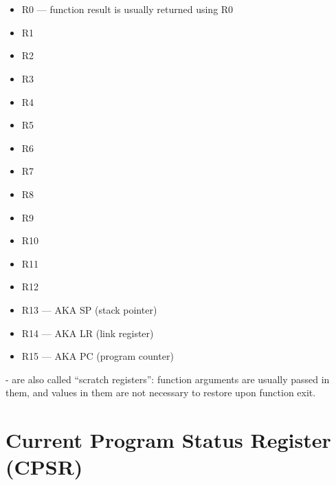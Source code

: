 \section{}

\begin{itemize}
	\item R0 --- 
		{function result is usually returned using R0}
	\item R1
	\item R2
	\item R3
	\item R4
	\item R5
	\item R6
	\item R7
	\item R8
	\item R9
	\item R10
	\item R11
	\item R12
	\item R13 --- \ac{AKA} SP (\gls{stack pointer})
	\item R14 --- \ac{AKA} LR (\gls{link register})
	\item R15 --- \ac{AKA} PC (program counter)
\end{itemize}

- 
{are also called ``scratch registers'': function arguments are usually passed in them,
and values in them are not necessary to restore upon function exit}.

\section{Current Program Status Register (CPSR)}

